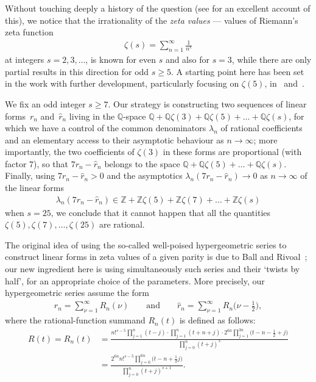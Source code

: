 \documentclass[pdftex]{sigma}
\begin{document}
Without touching deeply a history of the question (see \cite{Fi04} for an excellent account of this), we notice that the irrationality of the \emph{zeta values} --- values of Riemann's zeta function
\begin{gather*}
\zeta(s)=\sum_{n=1}^\infty\frac1{n^s}
\end{gather*}
at integers $s=2,3,\dots$, is known for even $s$ and also for $s=3$, while there are only partial results in this direction for odd $s\ge5$.
A starting point here has been set in the work \cite{BR01} with further development, particularly focusing on $\zeta(5)$, in~\cite{Ri02} and~\cite{Zu04}.

We fix an odd integer $s\ge7$. Our strategy is constructing two sequences of linear forms~$r_n$ and~$\hat r_n$ living in the $\mathbb Q$-space $\mathbb Q+\mathbb Q\zeta(3)+\mathbb Q\zeta(5)+\dots+\mathbb Q\zeta(s)$, for which we have a control of the common denominators $\lambda_n$ of rational coefficients and an elementary access to their asymptotic behaviour as $n\to\infty$; more importantly, the two coefficients of $\zeta(3)$ in these forms are proportional (with factor $7$), so that $7r_n-\hat r_n$ belongs to the space $\mathbb Q+\mathbb Q\zeta(5)+\dots+\mathbb Q\zeta(s)$. Finally, using $7r_n-\hat r_n>0$ and the asymptotics $\lambda_n(7r_n-\hat r_n)\to0$ as $n\to\infty$ of the linear forms
\begin{gather*}
\lambda_n(7r_n-\hat r_n)\in\mathbb Z+\mathbb Z\zeta(5)+\mathbb Z\zeta(7)+\dots+\mathbb Z\zeta(s)
\end{gather*}
when $s=25$, we conclude that it cannot happen that all the quantities $\zeta(5),\zeta(7),\dots,\allowbreak\zeta(25)$ are rational.

The original idea of using the so-called well-poised hypergeometric series to construct linear forms in zeta values of a given parity is due
to Ball and Rivoal~\cite{BR01}; our new ingredient here is using simultaneously such series and their `twists by half', for an appropriate choice of the parameters. More precisely, our hypergeometric series assume the form
\begin{gather}
r_n=\sum_{\nu=1}^\infty R_n(\nu) \qquad\text{and}\qquad \hat r_n=\sum_{\nu=1}^\infty R_n\big(\nu-\tfrac12\big),
\label{e01}
\end{gather}
where the rational-function summand $R_n(t)$ is defined as follows:
\begin{align}
R(t)=R_n(t)
&=\frac{n!^{s-5}\prod_{j=1}^n(t-j)\cdot\prod_{j=1}^n(t+n+j)\cdot2^{6n}\prod_{j=1}^{3n}\big(t-n-\frac12+j\big)} {\prod_{j=0}^n(t+j)^s}\nonumber\\
&=\frac{2^{6n}n!^{s-5}\prod_{j=0}^{6n}\big(t-n+\frac12j\big)}{\prod_{j=0}^n(t+j)^{s+1}}.\label{e02}
\end{align}
\end{document}
